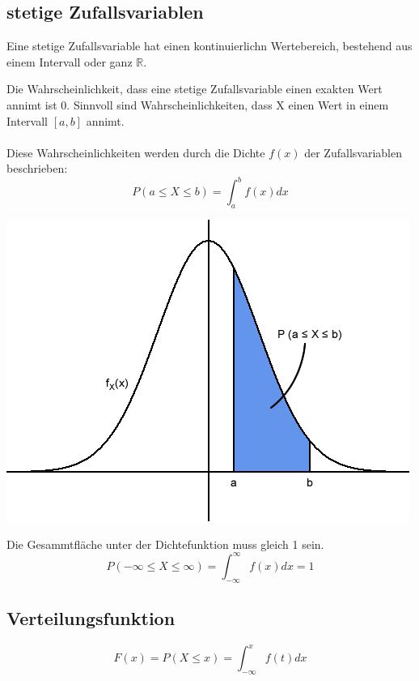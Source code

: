 \documentclass[10pt]{article}
\newtheorem[M]{definition}{Def.}
\newtheorem[M]{satz}{Satz}
\numberwithin{equation}{section}
\newcommand{\RN}{\mathbb{R}} %
\begin{document}
\subsection{stetige Zufallsvariablen}
\begin{definition}
Eine stetige Zufallsvariable hat einen kontinuierlichn Wertebereich, bestehend aus einem Intervall oder ganz $\RN$.
\end{definition}
Die Wahrscheinlichkeit, dass eine stetige Zufallsvariable einen exakten Wert annimt ist 0. Sinnvoll sind Wahrscheinlichkeiten, dass X einen Wert in einem Intervall $[a,b]$ annimt. \\ \\
Diese Wahrscheinlichkeiten werden durch die Dichte $f(x)$ der Zufallsvariablen beschrieben:
\begin{equation}
	P(a \leq X \leq b) = \int_a^b f(x) dx
\end{equation}
\begin{center}
	\includegraphics[scale=0.3]{Integral-dichte.png}
\end{center}
Die Gesammtfläche unter der Dichtefunktion muss gleich 1 sein.
\begin{equation}
P(-\infty \leq X \leq \infty) = \int_{-\infty}^{\infty} f(x) dx=1
\end{equation}
\subsection{Verteilungsfunktion}
\begin{equation}
F(x) = P(X \leq x) = \int_{-\infty}^x f(t) dx
\end{equation}
\end{document}
